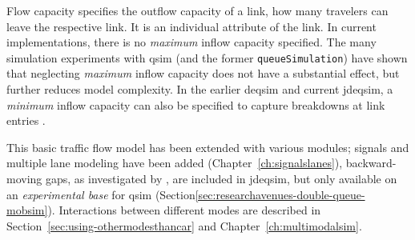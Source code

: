 Flow capacity specifies the outflow capacity of a link, \ie how many travelers can leave the respective link. 
It is an individual attribute of the link.  
In current implementations, there is no \emph{maximum} inflow capacity specified.
The many simulation experiments with \gls{qsim} (and the former \lstinline|queueSimulation|) have shown that neglecting \emph{maximum} inflow capacity does not have a substantial effect, but further reduces model complexity. 
In the earlier \gls{deqsim} and current \gls{jdeqsim}, a \emph{minimum} inflow capacity can also be specified to capture breakdowns at link entries \citep[][p.~99]{Charypar_PhDThesis_2008}.

This basic traffic flow model has been extended with various modules; signals and multiple lane modeling have been added (Chapter~\ref{ch:signalslanes}), 
backward-moving gaps, as investigated by \citet[][]{Charypar_PhDThesis_2008}, are included in \gls{jdeqsim}, but only available on an \emph{experimental base} for \gls{qsim} (Section\ref{sec:researchavenues-double-queue-mobsim}). 
Interactions between different modes are described in Section~\ref{sec:using-othermodesthancar} and Chapter~\ref{ch:multimodalsim}. 

